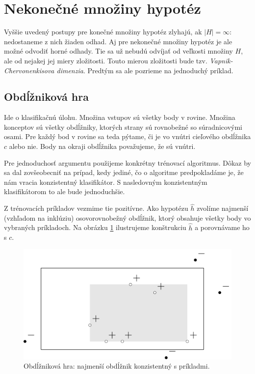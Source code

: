 \section{Nekonečné množiny hypotéz}

Vyššie uvedený postupy pre konečné množiny hypotéz zlyhajú, ak
$|H| = \infty$: nedostaneme z nich žiaden odhad. Aj pre nekonečné
množiny hypotéz je ale možné odvodiť horné odhady. Tie sa už nebudú
odvíjať od veľkosti množiny $H$, ale od nejakej jej miery zložitosti.
Touto mierou zložitosti bude tzv. \emph{Vapnik-Chervonenkisova dimenzia}.
Predtým sa ale pozrieme na jednoduchý príklad.




\subsection{Obdĺžniková hra}

Ide o klasifikačnú úlohu. Množina vstupov sú všetky body v rovine.
Množina konceptov sú všetky obdĺžniky, ktorých strany sú rovnobežné
so súradnicovými osami. Pre každý bod v rovine sa teda pýtame, či je
vo vnútri cieľového obdĺžnika $c$ alebo nie. Body na okraji obdĺžnika
považujeme, že sú vnútri.

Pre jednoduchosť argumentu použijeme konkrétny trénovací algoritmus.
Dôkaz by sa dal zovšeobecniť na prípad, kedy jediné, čo o algoritme
predpokladáme je, že nám vracia konzistentný klasifikátor. S nasledovným
konzistentným klasifikátorom to ale bude jednoduchšie.

\medskip

Z trénovacích príkladov vezmime tie pozitívne. Ako hypotézu $\hat{h}$
zvolíme najmenší (vzhľadom na inklúziu) osovorovnobežný obdĺžnik,
ktorý obsahuje všetky body vo vybraných príkladoch. Na obrázku
\ref{rectgame:hath} ilustrujeme konštrukciu $\hat{h}$ a porovnávame
ho s $c$.

\begin{figure}
  \centering
  \includegraphics[scale=1]{obrazky/rectgame1.pdf}
  \caption{Obdĺžniková hra: najmenší obdĺžnik konzistentný s príkladmi.}
  \label{rectgame:hath}
\end{figure}

